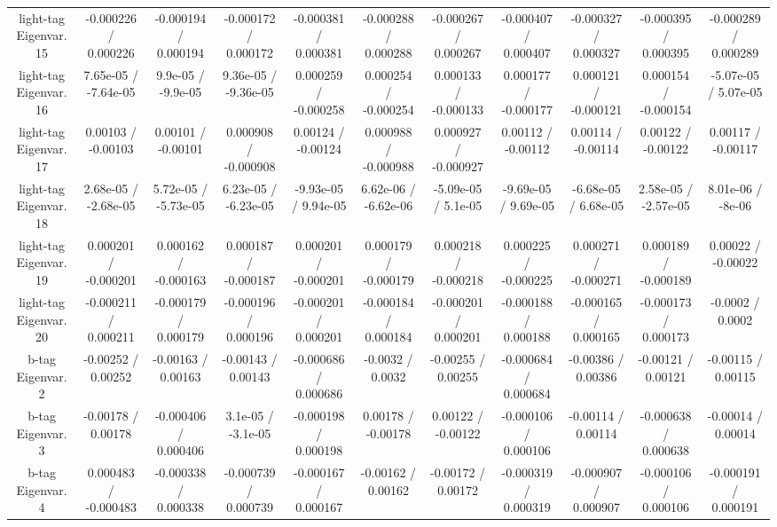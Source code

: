\begin{table}[htbp]
\begin{center}
\begin{tabular}{|c|c|c|c|c|c|c|c|c|c|c|}
  light-tag Eigenvar. 15 & -0.000226 / 0.000226 & -0.000194 / 0.000194 & -0.000172 / 0.000172 & -0.000381 / 0.000381 & -0.000288 / 0.000288 & -0.000267 / 0.000267 & -0.000407 / 0.000407 & -0.000327 / 0.000327 & -0.000395 / 0.000395 & -0.000289 / 0.000289 \\ 
  light-tag Eigenvar. 16 & 7.65e-05 / -7.64e-05 & 9.9e-05 / -9.9e-05 & 9.36e-05 / -9.36e-05 & 0.000259 / -0.000258 & 0.000254 / -0.000254 & 0.000133 / -0.000133 & 0.000177 / -0.000177 & 0.000121 / -0.000121 & 0.000154 / -0.000154 & -5.07e-05 / 5.07e-05 \\ 
  light-tag Eigenvar. 17 & 0.00103 / -0.00103 & 0.00101 / -0.00101 & 0.000908 / -0.000908 & 0.00124 / -0.00124 & 0.000988 / -0.000988 & 0.000927 / -0.000927 & 0.00112 / -0.00112 & 0.00114 / -0.00114 & 0.00122 / -0.00122 & 0.00117 / -0.00117 \\ 
  light-tag Eigenvar. 18 & 2.68e-05 / -2.68e-05 & 5.72e-05 / -5.73e-05 & 6.23e-05 / -6.23e-05 & -9.93e-05 / 9.94e-05 & 6.62e-06 / -6.62e-06 & -5.09e-05 / 5.1e-05 & -9.69e-05 / 9.69e-05 & -6.68e-05 / 6.68e-05 & 2.58e-05 / -2.57e-05 & 8.01e-06 / -8e-06 \\ 
  light-tag Eigenvar. 19 & 0.000201 / -0.000201 & 0.000162 / -0.000163 & 0.000187 / -0.000187 & 0.000201 / -0.000201 & 0.000179 / -0.000179 & 0.000218 / -0.000218 & 0.000225 / -0.000225 & 0.000271 / -0.000271 & 0.000189 / -0.000189 & 0.00022 / -0.00022 \\ 
  light-tag Eigenvar. 20 & -0.000211 / 0.000211 & -0.000179 / 0.000179 & -0.000196 / 0.000196 & -0.000201 / 0.000201 & -0.000184 / 0.000184 & -0.000201 / 0.000201 & -0.000188 / 0.000188 & -0.000165 / 0.000165 & -0.000173 / 0.000173 & -0.0002 / 0.0002 \\ 
  b-tag Eigenvar. 2 & -0.00252 / 0.00252 & -0.00163 / 0.00163 & -0.00143 / 0.00143 & -0.000686 / 0.000686 & -0.0032 / 0.0032 & -0.00255 / 0.00255 & -0.000684 / 0.000684 & -0.00386 / 0.00386 & -0.00121 / 0.00121 & -0.00115 / 0.00115 \\ 
  b-tag Eigenvar. 3 & -0.00178 / 0.00178 & -0.000406 / 0.000406 & 3.1e-05 / -3.1e-05 & -0.000198 / 0.000198 & 0.00178 / -0.00178 & 0.00122 / -0.00122 & -0.000106 / 0.000106 & -0.00114 / 0.00114 & -0.000638 / 0.000638 & -0.00014 / 0.00014 \\ 
  b-tag Eigenvar. 4 & 0.000483 / -0.000483 & -0.000338 / 0.000338 & -0.000739 / 0.000739 & -0.000167 / 0.000167 & -0.00162 / 0.00162 & -0.00172 / 0.00172 & -0.000319 / 0.000319 & -0.000907 / 0.000907 & -0.000106 / 0.000106 & -0.000191 / 0.000191 \\ 

\end{tabular}
\end{center}
\end{table}
